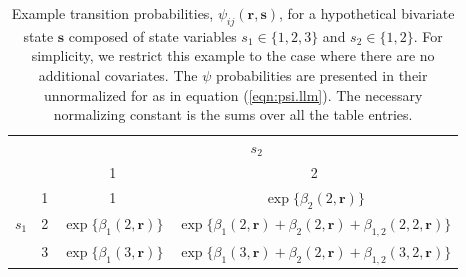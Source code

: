 \documentclass[sts]{imsart}
\numberwithin{equation}{section}
\theoremstyle{plain}
\newcommand{\bs}{\ensuremath{\mathbf{s}}}
\newcommand{\br}{\ensuremath{\mathbf{r}}}
\begin{document}
\clearpage

\begin{table}[ht]
\centering
\parbox{\textwidth}{\caption{\label{tb:psi.example}  Example transition probabilities, $\psi_{ij}(\br,\bs)$, for a hypothetical bivariate state $\bs$ composed of state variables $s_1\in\{1,2,3\}$ and $s_2\in\{1,2\}$. For simplicity, we restrict this example to the case where there are no additional covariates. The $\psi$ probabilities are presented in their unnormalized for as in equation (\ref{eqn:psi.llm}). The necessary normalizing constant is the sums over all the table entries.}} \medskip

\begin{tabular}{cc|cc|} \cline{3-4}
                           &  & \multicolumn{2}{c|}{$s_2$}\\ 
                           &  & 1 & 2 \\ \hline
\multicolumn{1}{|c}{}      & \multicolumn{1}{c|}{1} & 1 & $\exp\{\beta_2(2,\br)\}$ \\
\multicolumn{1}{|c}{$s_1$} & \multicolumn{1}{c|}{2} & $\exp\{\beta_1(2,\br)\}$ & $\exp\{\beta_1(2,\br)+\beta_2(2,\br)+\beta_{1,2}(2,2,\br)\}$ \\
\multicolumn{1}{|c}{}      &  \multicolumn{1}{c|}{3} & $\exp\{\beta_1(3,\br)\}$ & $\exp\{\beta_1(3,\br)+\beta_2(2,\br)+\beta_{1,2}(3,2,\br)\}$ \\ \hline
\end{tabular}
\end{table}


\clearpage
\end{document}
